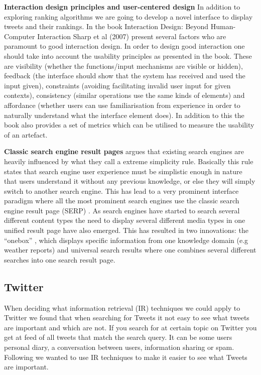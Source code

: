 {\bf Interaction design principles and user-centered design}\newline
In addition to exploring ranking algorithms we are going to develop a novel interface to display tweets and their rankings. In the book Interaction Design: Beyond Human-Computer Interaction Sharp et al (2007) present several factors who are paramount to good interaction design. In order to design good interaction one should take into account the usability principles as presented in the book. These are visibility (whether the functions/input mechanisms are visible or hidden), feedback (the interface should show that the system has received and used the input given), constraints (avoiding facilitating invalid user input for given contexts), consistency (similar operations use the same kinds of elements) and affordance (whether users can use familiarisation from experience in order to naturally understand what the interface element does). In addition to this the book also provides a set of metrics which can be utilised to measure the usability of an artefact.\newline

{\bf \noindent Classic search engine result pages}\newline
\citet[p.480]{Baeza-Yates2011} argues that existing search engines are heavily influenced by what they call a extreme simplicity rule. Basically this rule states that search engine user experience must be simplistic enough in nature that users understand it without any previous knowledge, or else they will simply switch to another search engine. This has lead to a very prominent interface paradigm where all the most prominent search engines use the classic search engine result page (SERP) \citep{Baeza-Yates2011}. 
As search engines have started to search several different content types the need to display several different media types in one unified result page have also emerged. This has resulted in two innovations: the “onebox” \citep{Baeza-Yates2011}, which displays specific information from one knowledge domain (e.g weather reports) and universal search results where one combines several different searches into one search result page.


\subsection{Twitter}
When deciding what information retrieval (IR) techniques we could apply to Twitter we found that when searching for Tweets it not easy to see what tweets are important and which are not. If you search for at certain topic on Twitter you get at feed of all tweets that match the search query. It can be some users personal diary, a conversation between users, information sharing or spam. Following we wanted to use IR techniques to make it easier to see what Tweets are important. 


